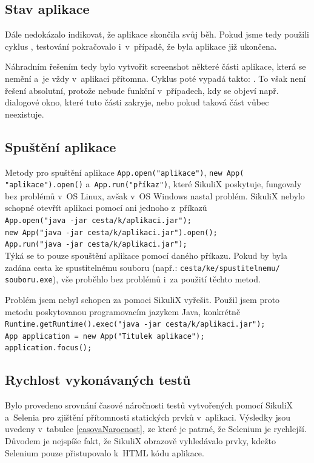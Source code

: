 		\subsection{Stav aplikace}
		Dále nedokázalo indikovat, že aplikace skončila svůj běh. Pokud jsme tedy použili cyklus , testování pokračovalo i~v~případě, že byla aplikace již ukončena.
	
		Náhradním řešením tedy bylo vytvořit screenshot některé části aplikace, která se nemění a~je vždy v~aplikaci přítomna. Cyklus poté vypadá takto: . To však není řešení absolutní, protože nebude funkční v~případech, kdy se objeví např. dialogové okno, které tuto části zakryje, nebo pokud taková část vůbec neexistuje.
		
		\subsection{Spuštění aplikace}
		Metody pro spuštění aplikace \texttt{App.open("aplikace")}, \texttt{new App(\\"aplikace").open()} a~\texttt{App.run("příkaz")}, které SikuliX poskytuje, fungovaly bez problémů v~OS Linux, avšak v~OS Windows nastal problém. SikuliX nebylo schopné otevřít aplikaci pomocí ani jednoho z~příkazů\\[0.2cm]
		\texttt{App.open("java -jar cesta/k/aplikaci.jar");\\
		new App("java -jar cesta/k/aplikaci.jar").open();\\
		App.run("java -jar cesta/k/aplikaci.jar");}\\[0.2cm]
		Týká se to pouze spouštění aplikace pomocí daného příkazu. Pokud by byla zadána cesta ke spustitelnému souboru (např.: \texttt{cesta/ke/spustitelnemu/\\souboru.exe}), vše proběhlo bez problémů i~za použití těchto metod.
		
		Problém jsem nebyl schopen za pomoci SikuliX vyřešit. Použil jsem proto metodu poskytovanou programovacím jazykem Java, konkrétně\\[0.2cm]
		\texttt{Runtime.getRuntime().exec("java -jar cesta/k/aplikaci.jar");\\
		App application = new App("Titulek aplikace");\\
		application.focus();}
		
		\subsection{Rychlost vykonávaných testů}
		Bylo provedeno srovnání časové náročnosti testů vytvořených pomocí SikuliX a~Selenia pro zjištění přítomnosti statických prvků v~aplikaci. Výsledky jsou uvedeny v~tabulce \ref{casovaNarocnost}, ze které je patrné, že Selenium je rychlejší. Důvodem je nejspíše fakt, že SikuliX obrazově vyhledávalo prvky, kdežto Selenium pouze přistupovalo k~HTML kódu aplikace.
		
